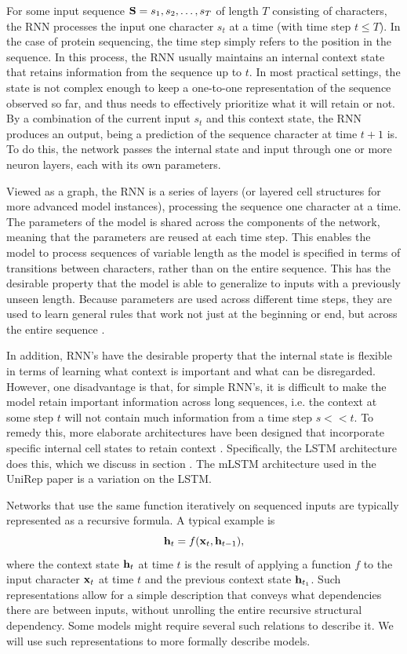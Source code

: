 \documentclass[a4paper,12pt]{article}
\begin{document}
For some input sequence $\mathbf{ S } = s_1, s_2, \ldots, s_T$ of length $T$ consisting of characters, the RNN processes the input one character $s_t$ at a time (with time step $t \leq T$). In the case of protein sequencing, the time step simply refers to the position in the sequence. In this process, the RNN usually maintains an internal context state that retains information from the sequence up to $t$. In most practical settings, the state is not complex enough to keep a one-to-one representation of the sequence observed so far, and thus needs to effectively prioritize what it will retain or not. By a combination of the current input $s_t$ and this context state, the RNN produces an output, being a prediction of the sequence character at time $t + 1$ is. To do this, the network passes the internal state and input through one or more neuron layers, each with its own parameters.

Viewed as a graph, the RNN is a series of layers (or layered cell structures for more advanced model instances), processing the sequence one character at a time. The parameters of the model is shared across the components of the network, meaning that the parameters are reused at each time step. This enables the model to process sequences of variable length as the model is specified in terms of transitions between characters, rather than on the entire sequence. This has the desirable property that the model is able to generalize to inputs with a previously unseen length. Because parameters are used across different time steps, they are used to learn general rules that work not just at the beginning or end, but across the entire sequence \cite{Goodfellow-et-al-2016}.

In addition, RNN's have the desirable property that the internal state is flexible in terms of learning what context is important and what can be disregarded. However, one disadvantage is that, for simple RNN's, it is difficult to make the model retain important information across long sequences, i.e. the context at some step $t$ will not contain much information from a time step $s << t$. To remedy this, more elaborate architectures have been designed that incorporate specific internal cell states to retain context \cite{graves2012supervised}. Specifically, the LSTM architecture does this, which we discuss in section . The mLSTM architecture used in the UniRep paper is a variation on the LSTM.

Networks that use the same function iteratively on sequenced inputs are typically represented as a recursive formula. A typical example is
\[ \mathbf{ h }_t = f{\mathopen{} \left( \mathbf{ x }_t, \mathbf{ h }_{t - 1} \right) \mathclose{}}, \]
where the context state $\mathbf{ h }_t$ at time $t$ is the result of applying a function $f$ to the input character $\mathbf{ x }_t$ at time $t$ and the previous context state $\mathbf{ h }_{t_1}$. Such representations allow for a simple description that conveys what dependencies there are between inputs, without unrolling the entire recursive structural dependency. Some models might require several such relations to describe it. We will use such representations to more formally describe models.
\end{document}
